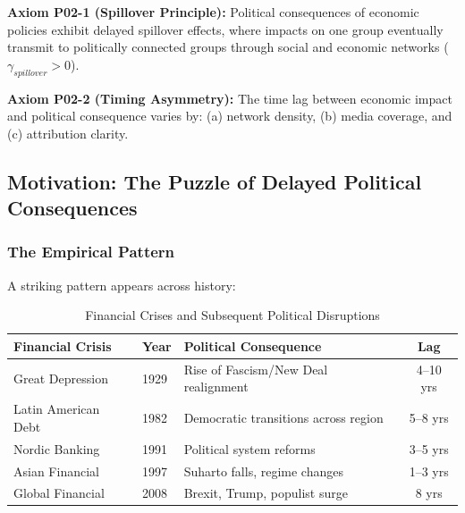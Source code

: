 \begin{tcolorbox}[colback=yellow!5!white, colframe=yellow!75!black,
    title=Axiom P02-1: Spillover Dynamics]
\textbf{Axiom P02-1 (Spillover Principle):}
Political consequences of economic policies exhibit delayed spillover effects,
where impacts on one group eventually transmit to politically connected groups
through social and economic networks ($\gamma_{spillover} > 0$).
\end{tcolorbox}

\begin{tcolorbox}[colback=yellow!5!white, colframe=yellow!75!black,
    title=Axiom P02-2: Asymmetric Timing]
\textbf{Axiom P02-2 (Timing Asymmetry):}
The time lag between economic impact and political consequence varies by:
(a) network density, (b) media coverage, and (c) attribution clarity.
\end{tcolorbox}



\subsection{Motivation: The Puzzle of Delayed Political Consequences}

\subsubsection{The Empirical Pattern}

A striking pattern appears across history:

\begin{table}[htbp]
\centering
\caption{Financial Crises and Subsequent Political Disruptions}
\label{tab:historical-pattern}
\small
\begin{tabular}{@{}lllc@{}}
\toprule
\textbf{Financial Crisis} & \textbf{Year} & \textbf{Political Consequence} & \textbf{Lag} \\
\midrule
Great Depression & 1929 & Rise of Fascism/New Deal realignment & 4--10 yrs \\
Latin American Debt & 1982 & Democratic transitions across region & 5--8 yrs \\
Nordic Banking & 1991 & Political system reforms & 3--5 yrs \\
Asian Financial & 1997 & Suharto falls, regime changes & 1--3 yrs \\
Global Financial & 2008 & Brexit, Trump, populist surge & 8 yrs \\
\bottomrule
\end{tabular}
\end{table}


